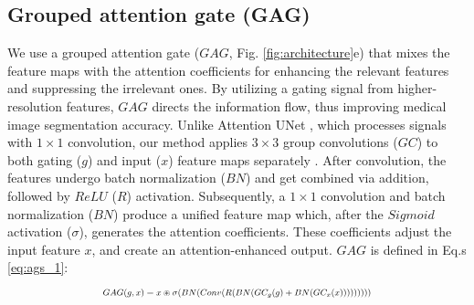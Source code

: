 \subsection{Grouped attention gate (GAG)}
We use a grouped attention gate ($GAG$, Fig. \ref{fig:architecture}e) that mixes the feature maps with the attention coefficients for enhancing the relevant features and suppressing the irrelevant ones. By utilizing a gating signal from higher-resolution features, $GAG$ directs the information flow, thus improving medical image segmentation accuracy. Unlike Attention UNet \cite{oktay2018attention}, which processes signals with $1\times1$ convolution, our method applies $3\times3$ group convolutions ($GC$) to both gating ($g$) and input ($x$) feature maps separately \cite{rahman2024emcad}. After convolution, the features undergo batch normalization ($BN$) and get combined via addition, followed by $ReLU$ ($R$) activation. Subsequently, a $1\times1$ convolution and batch normalization ($BN$) produce a unified feature map which, after the $Sigmoid$ activation ($\sigma$), generates the attention coefficients. These coefficients adjust the input feature $x$, and create an attention-enhanced output. $GAG$ is defined in Eq.s \ref{eq:ags_1}:%
\begin{equation}
\scalebox{0.7}{\(
   GAG(g, x) = x \circledast \sigma(BN(Conv(R(BN(GC_g(g) + BN(GC_x(x)))))))))%
   \)}
    \label{eq:ags_1}
\end{equation} 



